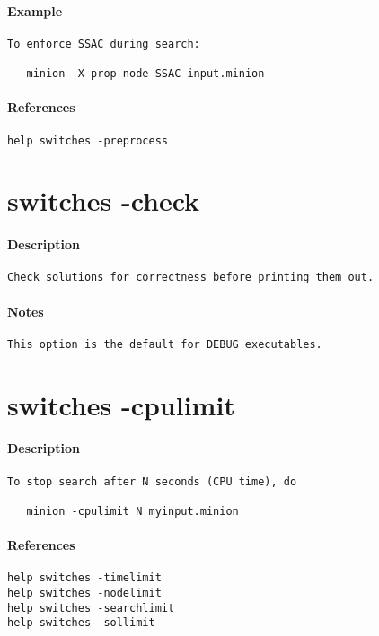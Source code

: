 \paragraph{Example}
{\footnotesize
\begin{verbatim}
To enforce SSAC during search:

   minion -X-prop-node SSAC input.minion
\end{verbatim}
}
\paragraph{References}
{\footnotesize
\begin{verbatim}
help switches -preprocess
\end{verbatim}
}
\section{switches -check}
\paragraph{Description}
{\footnotesize
\begin{verbatim}
Check solutions for correctness before printing them out.
\end{verbatim}
}
\paragraph{Notes}
{\footnotesize
\begin{verbatim}
This option is the default for DEBUG executables.
\end{verbatim}
}
\section{switches -cpulimit}
\paragraph{Description}
{\footnotesize
\begin{verbatim}
To stop search after N seconds (CPU time), do

   minion -cpulimit N myinput.minion
\end{verbatim}
}
\paragraph{References}
{\footnotesize
\begin{verbatim}
help switches -timelimit
help switches -nodelimit
help switches -searchlimit
help switches -sollimit
\end{verbatim}
}

